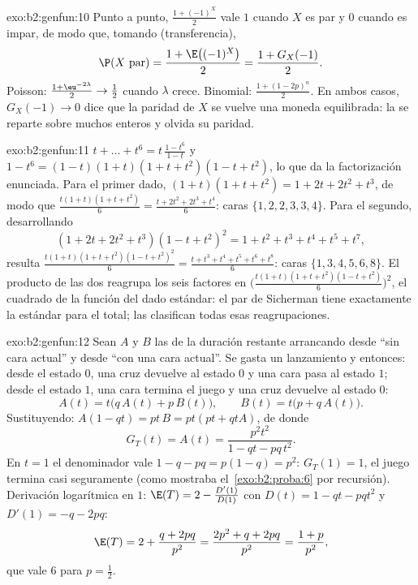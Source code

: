 \begin{solution}{exo:b2:genfun:10}
Punto a punto, $\frac{1 + (-1)^X}{2}$ vale $1$ cuando $X$ es par y
$0$ cuando es impar, de modo que, tomando 
(transferencia),
\[
\P(X \text{ par}) = \frac{1 + \E\bigl((-1)^X\bigr)}2 =
\frac{1 + G_X(-1)}2 .
\]
Poisson: $\frac{1 + \eu^{-2\lambda}}2 \to \frac12$ cuando $\lambda$
crece. Binomial: $\frac{1 + (1 - 2p)^n}2$. En ambos casos, $G_X(-1)
\to 0$ dice que la paridad de $X$ se vuelve una moneda equilibrada:
la  se reparte sobre muchos enteros y olvida su paridad.
\end{solution}

\begin{solution}{exo:b2:genfun:11}
$t + \dots + t^6 = t\,\frac{1 - t^6}{1 - t}$ y $1 - t^6 = (1 - t)(1 +
t)(1 + t + t^2)(1 - t + t^2)$, lo que da la factorización enunciada.
Para el primer dado, $(1 + t)(1 + t + t^2) = 1 + 2t + 2t^2 + t^3$, de
modo que $\frac{t(1+t)(1+t+t^2)}6 = \frac{t + 2t^2 + 2t^3 + t^4}6$:
caras $\{1, 2, 2, 3, 3, 4\}$. Para el segundo, desarrollando
\[
(1 + 2t + 2t^2 + t^3)(1 - t + t^2)^2 = 1 + t^2 + t^3 + t^4 +
t^5 + t^7,
\]
resulta $\frac{t(1+t)(1+t+t^2)(1-t+t^2)^2}6 = \frac{t + t^3 + t^4 +
t^5 + t^6 + t^8}6$: caras $\{1, 3, 4, 5, 6, 8\}$. El producto de las
dos  reagrupa los seis factores en
$\bigl(\frac{t(1+t)(1+t+t^2)(1-t+t^2)}6 \bigr)^2$, el cuadrado de la
función del dado estándar: el par de Sicherman tiene exactamente la
 estándar para el total; las  clasifican
todas esas reagrupaciones.
\end{solution}

\begin{solution}{exo:b2:genfun:12}
Sean $A$ y $B$ las  de la duración restante
arrancando desde ``sin cara actual'' y desde ``con una cara actual''.
Se gasta un lanzamiento y entonces: desde el estado $0$, una cruz
devuelve al estado $0$ y una cara pasa al estado $1$; desde el estado
$1$, una cara termina el juego y una cruz devuelve al estado $0$:
\[
A(t) = t\bigl(q\,A(t) + p\,B(t)\bigr),
\qquad
B(t) = t\bigl(p + q\,A(t)\bigr).
\]
Sustituyendo: $A(1 - qt) = pt\,B = pt(pt + qtA)$, de donde
\[
G_T(t) = A(t) = \frac{p^2t^2}{1 - qt - pq\,t^2} .
\]
En $t = 1$ el denominador vale $1 - q - pq = p(1 - q) = p^2$:
$G_T(1) = 1$, el juego termina casi seguramente (como mostraba el~\cref{exo:b2:proba:6} por recursión). Derivación logarítmica en $1$:
$\E(T) = 2 - \frac{D'(1)}{D(1)}$ con $D(t) = 1 - qt - pqt^2$ y
$D'(1) = -q - 2pq$:
\[
\E(T) = 2 + \frac{q + 2pq}{p^2} = \frac{2p^2 + q + 2pq}{p^2}
= \frac{1 + p}{p^2},
\]
que vale $6$ para $p = \frac12$.
\end{solution}

